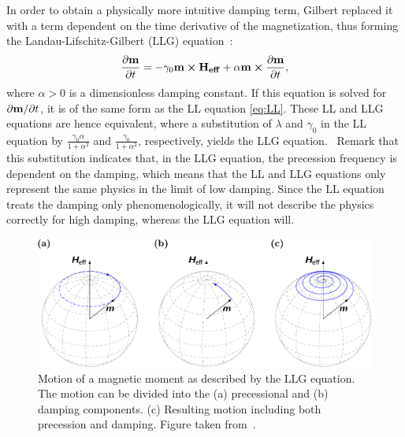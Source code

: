 \documentclass[10pt,a4paper]{article}
\begin{document}
In order to obtain a physically more intuitive damping term, Gilbert \cite{Gilbert1955anomalous} replaced it with a term dependent on the time derivative of the magnetization, thus forming the Landau-Lifschitz-Gilbert (LLG) equation~\cite{ThermFluc_SingleDomain, phd_leliaert, LEL-17b}:
\begin{equation}
	\frac{\partial \vb{m}}{\partial t} = - \gamma_0\vb{m} \cross \vb{H_{eff}} + \alpha \vb{m} \cross \frac{\partial \vb{m}}{\partial t} \mathrm{,}
	\label{eq:LLG}
\end{equation}
where $\alpha>0$ is a dimensionless damping constant. If this equation is solved for $\partial \vb{m}/\partial t$, it is of the same form as the LL equation \eqref{eq:LL}. These LL and LLG equations are hence equivalent, where a substitution of $\lambda$ and $\gamma_0$ in the LL equation by $\frac{\gamma_0 \alpha}{1+\alpha^2}$ and $\frac{\gamma_0}{1+\alpha^2}$, respectively, yields the LLG equation.~\cite{ThermFluc_SingleDomain,phd_leliaert} Remark that this substitution indicates that, in the LLG equation, the precession frequency is dependent on the damping, which means that the LL and LLG equations only represent the same physics in the limit of low damping. Since the LL equation treats the damping only phenomenologically, it will not describe the physics correctly for high damping, whereas the LLG equation will.~\cite{phd_leliaert}

\begin{figure}
    \centering
    \includegraphics[width=0.9\columnwidth]{Figures/Introduction/abert2013discrete - Figure 2.2.pdf}
    \caption{Motion of a magnetic moment as described by the LLG equation. The motion can be divided into the (a) precessional and (b) damping components. (c) Resulting motion including both precession and damping. Figure taken from~\cite{abert2013discrete}.}
    \label{fig:LLG_motion_Heff}
\end{figure}
\end{document}
